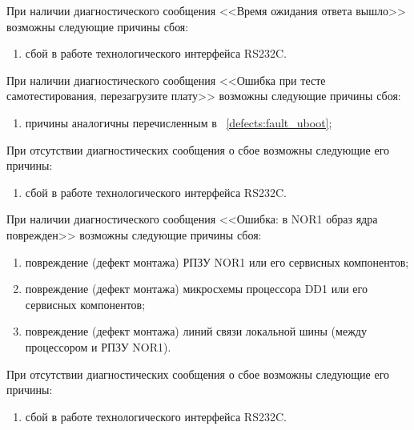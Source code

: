     \subpoint При наличии диагностического сообщения <<Время ожидания ответа вышло>> возможны следующие причины сбоя:
      \begin{enumerate}
	\item сбой в работе технологического интерфейса RS232C.	  
      \end{enumerate}  
    
    \subpoint  При наличии диагностического сообщения <<Ошибка при тесте самотестирования, перезагрузите плату>> возможны следующие причины сбоя:
      \begin{enumerate}		
	\item причины аналогичны перечисленным в ~\ref{defects:fault_uboot};
      \end{enumerate}
    
    \subpoint При отсутствии диагностических сообщения о сбое возможны следующие его причины:
      \begin{enumerate}
	\item сбой в работе технологического интерфейса RS232C.	  
      \end{enumerate}
      
    \subpoint При наличии диагностического сообщения <<Ошибка: в NOR1 образ ядра поврежден>> возможны следующие причины сбоя:
      \begin{enumerate}
	\item повреждение (дефект монтажа) РПЗУ NOR1 или его сервисных компонентов;
	\item повреждение (дефект монтажа) микросхемы процессора DD1 или его сервисных компонентов;
	\item повреждение (дефект монтажа) линий связи локальной шины (между процессором и РПЗУ NOR1).
      \end{enumerate}
      
    \subpoint При отсутствии диагностических сообщения о сбое возможны следующие его причины:
      \begin{enumerate}
	\item сбой в работе технологического интерфейса RS232C.
      \end{enumerate}
      
